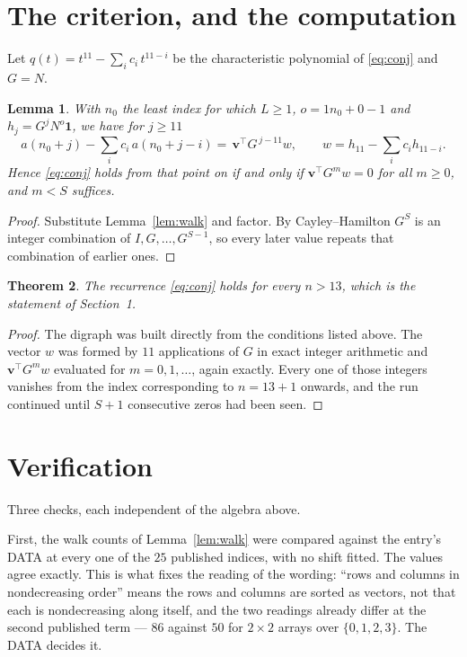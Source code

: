 \documentclass[11pt,a4paper]{article}
\theoremstyle{plain}
\newtheorem{theorem}{Theorem}
\newtheorem{lemma}[theorem]{Lemma}
\theoremstyle{definition}
\begin{document}
\section{The criterion, and the computation}

Let $q(t)=t^{11}-\sum_i c_i\,t^{11-i}$ be the characteristic polynomial of
\eqref{eq:conj} and $G=N$.

\begin{lemma}\label{lem:crit}
With $n_0$ the least index for which $L\ge1$, $o=1n_0+0-1$ and
$h_j=G^{j}N^{o}\mathbf{1}$, we have for $j\ge11$
\[
a(n_0+j)-\sum_i c_i\,a(n_0+j-i)=\,\mathbf{v}^{\!\top}G^{\,j-11}w,
\qquad w=h_{11}-\sum_i c_ih_{11-i} .
\]
Hence \eqref{eq:conj} holds from that point on if and only if
$\mathbf{v}^{\!\top}G^{m}w=0$ for all $m\ge0$, and $m<S$ suffices.
\end{lemma}

\begin{proof}
Substitute Lemma~\ref{lem:walk} and factor. By Cayley--Hamilton $G^{S}$ is an integer
combination of $I,G,\dots,G^{S-1}$, so every later value repeats that combination of
earlier ones.
\end{proof}

\begin{theorem}
The recurrence \eqref{eq:conj} holds for every $n>13$, which is the statement of
Section~1.
\end{theorem}

\begin{proof}
The digraph was built directly from the conditions listed above. The vector $w$ was formed by
$11$ applications of $G$ in exact integer arithmetic and $\mathbf{v}^{\!\top}G^{m}w$
evaluated for $m=0,1,\dots$, again exactly. Every one of those integers vanishes from the
index corresponding to $n=13+1$ onwards, and the run continued until $S+1$ consecutive
zeros had been seen.
\end{proof}

\section{Verification}

Three checks, each independent of the algebra above.

First, the walk counts of Lemma~\ref{lem:walk} were compared against the entry's DATA at
every one of the $25$ published indices, with no shift fitted. The values agree exactly.
This is what fixes the reading of the wording: ``rows and columns in nondecreasing order''
means the rows and columns are sorted as vectors, not that each is nondecreasing along
itself, and the two readings already differ at the second published term --- $86$ against
$50$ for $2\times2$ arrays over $\{0,1,2,3\}$. The DATA decides it.
\end{document}
